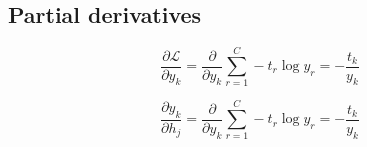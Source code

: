 \documentclass{article}
\begin{document}
\subsection*{Partial derivatives}

\begin{equation}
    \frac{\partial \mathcal{L}}{\partial y_k}
    = \frac{\partial}{\partial y_k} \sum_{r=1}^C - t_r \log y_r
    = -\frac{t_k}{y_k}
\end{equation}

\begin{equation}
    \frac{\partial y_k}{\partial h_j}
    = \frac{\partial}{\partial y_k} \sum_{r=1}^C - t_r \log y_r
    = -\frac{t_k}{y_k}
\end{equation}
\end{document}
